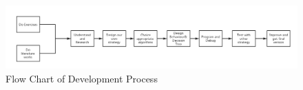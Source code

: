 \begin{figure}[htb]
    \centering
    \includegraphics[width=1\textwidth]{images/flow_chart.png}
    \caption{Flow Chart of Development Process}
    \label{figure:flow_chart}
\end{figure}